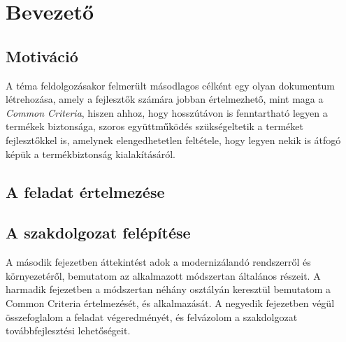 \chapter{Bevezető}

\section{Motiváció}

A téma feldolgozásakor felmerült másodlagos célként egy olyan dokumentum létrehozása, amely
a fejlesztők számára jobban értelmezhető, mint maga a \emph{Common Criteria}, hiszen ahhoz, hogy
hosszútávon is fenntartható legyen a termékek biztonsága, szoros együttműködés szükségeltetik
a terméket fejlesztőkkel is, amelynek elengedhetetlen feltétele, hogy legyen nekik is átfogó képük
a termékbiztonság kialakításáról.

\section{A feladat értelmezése}

\section{A szakdolgozat felépítése}
A második fejezetben áttekintést adok a modernizálandó rendszerről és környezetéről, bemutatom az
alkalmazott módszertan általános részeit. A harmadik fejezetben a módszertan néhány osztályán
keresztül bemutatom a Common Criteria értelmezését, és alkalmazását.
A negyedik fejezetben végül összefoglalom a feladat végeredményét, és felvázolom a szakdolgozat
továbbfejlesztési lehetőségeit.
